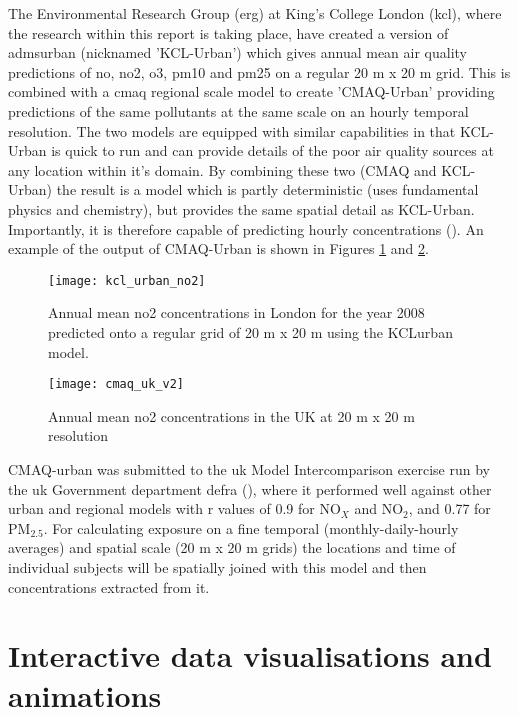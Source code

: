 The Environmental Research Group (\gls{erg}) at King's College London (\gls{kcl}), where the research within this report is taking place, have created a version of \gls{admsurban} (nicknamed 'KCL-Urban') which gives annual mean air quality predictions of \gls{no}, \gls{no2}, \gls{o3}, \gls{pm10} and \gls{pm25} on a regular 20 m x 20 m grid. This is combined with a \gls{cmaq} regional scale model to create 'CMAQ-Urban' providing predictions of the same pollutants at the same scale on an hourly temporal resolution. The two models are equipped with similar capabilities in that KCL-Urban is quick to run and can provide details of the poor air quality sources at any location within it's domain. By combining these two (CMAQ and KCL-Urban) the result is a model which is partly deterministic (uses fundamental physics and chemistry), but provides the same spatial detail as KCL-Urban. Importantly, it is therefore capable of predicting hourly concentrations (\cite{Beevers2013}). An example of the output of CMAQ-Urban is shown in Figures \ref{fig:kcl_urban_no2} and \ref{fig:cmaq_uk}.

\begin{figure}[H]
\centering
\texttt{[image: kcl\_urban\_no2]}
\caption{Annual mean \gls{no2} concentrations in London for the year 2008 predicted onto a regular grid of 20 m x 20 m using the KCLurban model.}
\label{fig:kcl_urban_no2}
\end{figure}

\begin{figure}[H]
\centering
\texttt{[image: cmaq\_uk\_v2]}
\caption{Annual mean \gls{no2} concentrations in the UK at 20 m x 20 m resolution}
\label{fig:cmaq_uk}
\end{figure}

CMAQ-urban was submitted to the  \gls{uk} Model Intercomparison exercise run by the \gls{uk} Government department \gls{defra} (\cite{Carslaw2013}), where it performed well against other urban and regional models with r values of 0.9 for NO$_{X}$ and NO$_{2}$, and 0.77 for PM$_{2.5}$. For calculating exposure on a fine temporal (monthly-daily-hourly averages) and spatial scale (20 m x 20 m grids) the locations and time of individual subjects will be spatially joined with this model and then concentrations extracted from it.


\section{Interactive data visualisations and animations}
\label{sec:interactivedata}

